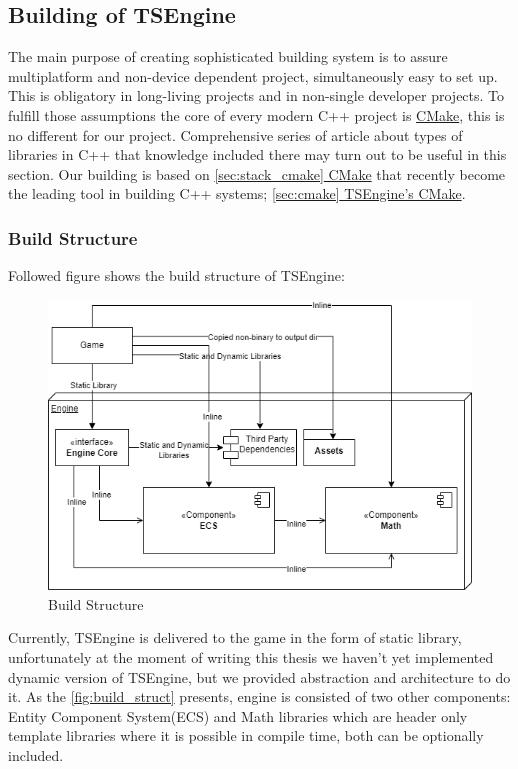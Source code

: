 \newpage
\subsection{Building of TSEngine}
\label{sec:build}
\hspace{\parindent} The main purpose of creating sophisticated building system is to assure multiplatform and non-device dependent project, simultaneously easy to set up.\\ This is obligatory in long-living projects and in non-single developer projects.
To fulfill those assumptions the core of every modern C++ project is \hyperref[sec:stack_cmake]{CMake}, this is no different for our project.
Comprehensive series of article about types of libraries in C++ \cite{cpplibs} that knowledge included there may turn out to be useful in this section.
Our building is based on \hyperref[sec:stack_cmake]{\ref*{sec:stack_cmake} CMake} that recently become the leading tool in building C++ systems; \hyperref[ses:cmake]{\ref*{sec:cmake} TSEngine's CMake}.
\subsubsection{Build Structure}
\hspace{\parindent} Followed figure shows the build structure of TSEngine:
\label{fig:build_struct}
\begin{figure}[h]
  \includegraphics[width=\linewidth]{figures/build.png}
  \caption{Build Structure}
\end{figure}
Currently, TSEngine is delivered to the game in the form of static library, unfortunately at the moment of writing this thesis we haven't yet implemented dynamic version of TSEngine, but we provided abstraction and architecture to do it.
As the \ref{fig:build_struct} presents, engine is consisted of two other components: Entity Component System(ECS) and Math libraries which are header only template libraries where it is possible in compile time, both can be optionally included.

